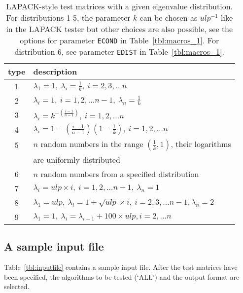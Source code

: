 \documentclass[acmtoms]{acmtrans2m}
\begin{document}
\begin{table}[htbp]
\protect \caption{LAPACK-style test matrices with a given eigenvalue 
distribution. For distributions 1-5,
the parameter $k$ can be chosen as $ulp^{-1}$ like in the LAPACK
tester but other choices are also possible, see the options for
parameter {\tt ECOND} in Table~\ref{tbl:macros_1}.
For distribution 6, see parameter {\tt EDIST} in Table~\ref{tbl:macros_1}.
} 
         \label{tbl:dist_types} 
\begin{center}
\begin{tabular}{cl} \hline
type & description \\ \hline\hline
  1  & $\lambda_1=1,~ \lambda_i=\frac{1}{k},~ i=2,3,\dots n$ \\
  2  & $\lambda_i=1,~ i=1,2,\dots n-1,~ \lambda_n=\frac{1}{k}$ \\
  3  & $\lambda_i=k^{-(\frac{i-1}{n-1})},~ i=1,2,\dots n$ \\
  4  & $\lambda_i=1-(\frac{i-1}{n-1})(1-\frac{1}{k}),~ i=1,2,\dots n$ \\
  5  & $n$ random numbers in the range $(\frac{1}{k},1)$,
       their logarithms \\
     & are uniformly distributed \\
  6  & $n$ random numbers from a specified distribution \\
  7  & $\lambda_i=ulp\times i,~ i=1,2,\dots n-1,~ \lambda_n=1$ \\
  8  & $\lambda_1=ulp,~ \lambda_i=1+\sqrt{ulp}\times i,~ 
       i=2,3,\dots n-1, \lambda_n =2$ \\
  9  & $\lambda_1=1,~ \lambda_i=\lambda_{i-1}+100\times ulp,
       i=2,\dots n$ \\
\hline
\end{tabular}
\end{center}
\end{table}

\subsection{A sample input file} 
\label{sec:sampleinput}

Table~\ref{tbl:inputfile} contains a sample input file. After the test
matrices have been specified, the algorithms to be tested (`ALL') 
and the output format are selected. 
\end{document}
